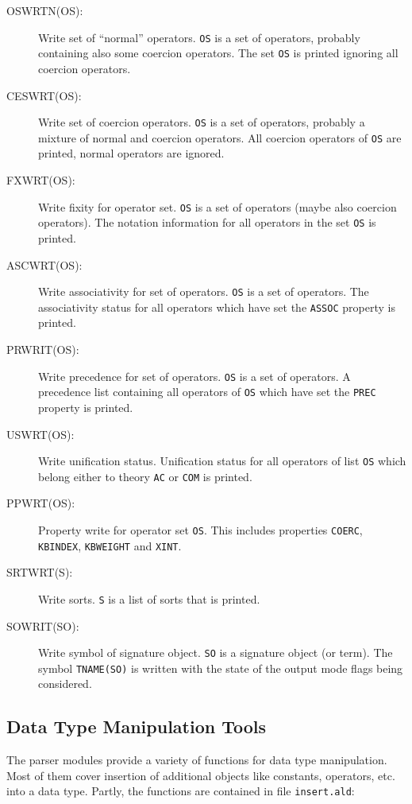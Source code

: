 \begin{description}
\item[OSWRTN(OS):] Write set of ``normal'' operators. {\tt OS}
is a set of operators, probably containing also some coercion operators.
The set {\tt OS} is printed ignoring all coercion operators.
\item[CESWRT(OS):] Write set of coercion operators. {\tt OS} is a
set of operators, probably a mixture of normal and coercion operators.
All coercion operators of {\tt OS} are printed, normal operators
are ignored.
\item[FXWRT(OS):] Write fixity for operator set. {\tt OS} is a set
of operators (maybe also coercion operators). The notation information
for all operators in the set {\tt OS} is printed.
\item[ASCWRT(OS):] Write associativity for set of operators. {\tt OS}
is a set of operators. The associativity status for all operators
which have set the {\tt ASSOC} property is printed.
\item[PRWRIT(OS):] Write precedence for set of operators. {\tt OS}
is a set of operators. A precedence list containing all operators of
{\tt OS} which have set the {\tt PREC} property is printed.
\item[USWRT(OS):] Write unification status. Unification status for
all operators of list {\tt OS} which belong either to theory {\tt AC} or
{\tt COM} is printed.
\item[PPWRT(OS):] Property write for operator set {\tt OS}. This includes
properties {\tt COERC}, {\tt KBINDEX}, {\tt KBWEIGHT} and
{\tt XINT}.
\item[SRTWRT(S):] Write sorts. {\tt S} is a list of sorts that is printed.
\item[SOWRIT(SO):] Write symbol of signature object. {\tt SO} is a signature
object (or term). The symbol {\tt TNAME(SO)} is written with
the state of the output mode flags being considered.
\end{description}

\subsection{Data Type Manipulation Tools}

The parser modules provide a variety of functions for data type manipulation.
Most of them cover insertion of additional objects like constants, operators,
etc. into a data type.
Partly, the functions are contained in file {\tt insert.ald}:


